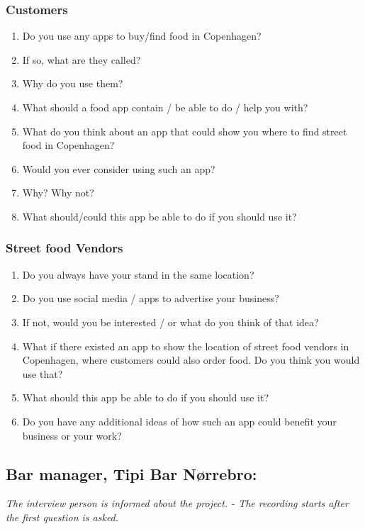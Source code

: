 \subsubsection{Customers}

\begin{enumerate}
  \item Do you use any apps to buy/find food in Copenhagen?
  \item If so, what are they called?
  \item Why do you use them?
  \item What should a food app contain / be able to do / help you with?
  \item What do you think about an app that could show you where to find street food in Copenhagen?
  \item Would you ever consider using such an app?
  \item Why? Why not?
  \item What should/could this app be able to do if you should use it?
\end{enumerate}


\subsubsection{Street food Vendors}

\begin{enumerate}
  \item Do you always have your stand in the same location?
  \item Do you use social media / apps to advertise your business?
  \item If not, would you be interested / or what do you think of that idea?
  \item What if there existed an app to show the location of street food vendors in Copenhagen, where customers could also order food. Do you think you would use that?
  \item What should this app be able to do if you should use it?
  \item Do you have any additional ideas of how such an app could benefit your business or your work?
\end{enumerate}


\subsection{Bar manager, Tipi Bar Nørrebro:}

\textit{The interview person is informed about the project. - The recording starts after the first question is asked.}

